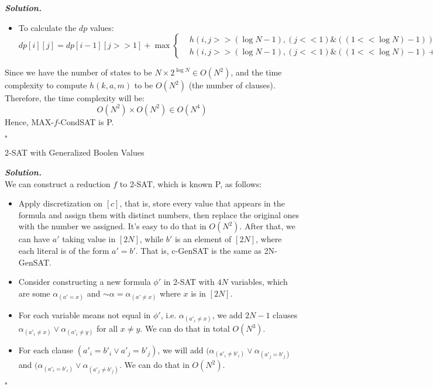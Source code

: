 \documentclass[12pt, a4paper, UTF8]{article}
\newenvironment{solution}[1][\it{Solution}]{\textbf{#1. }\\}{\begin{flushright}$\square$\end{flushright}}
\begin{document}
\begin{subprobs}
\begin{subprobs}
\begin{solution}
\begin{itemize}
            \item To calculate the $dp$ values:
                $$dp[i][j] = dp[i - 1][j >> 1] + \max\left\{\begin{aligned}&h(i, j >> (\log{N} - 1), (j << 1) \& ((1 << \log{N}) - 1)),\\
                    &h(i, j >> (\log{N} - 1), (j << 1) \& ((1 << \log{N}) - 1) + 1)
                \end{aligned}\right\}$$
        \end{itemize}
        Since we have the number of states to be $N \times 2^{\log{N}} \in O(N^2)$, and the time complexity to compute $h(k, a, m)$ to be $O(N^2)$ (the number of clauses).\\
        Therefore, the time complexity will be:
        $$O(N^2) \times O(N^2) \in O(N^4)$$
        Hence, MAX-$f$-CondSAT is P.
    \end{solution}
\end{subprobs}
\item 2-SAT with Generalized Boolen Values
\begin{subprobs}
\item
    \begin{solution}
        We can construct a reduction $f$ to 2-SAT, which is known P, as follows:\\
        \begin{itemize}
            \item Apply discretization on $[c]$, that is, store every value that appears in the formula and assign them with distinct numbers, then replace the original ones with the number we assigned. It's easy to do that in $O(N^2)$. After that, we can have $a'$ taking value in $[2N]$, while $b'$ is an element of $[2N]$, where each literal is of the form $a' = b'$. That is, c-GenSAT is the same as 2N-GenSAT.
            \item Consider constructing a new formula $\phi'$ in 2-SAT with $4N$ variables, which are some $\alpha_{(a' = x)}$ and $\sim{}\alpha = \alpha_{(a' \neq x)}$ where $x$ is in $[2N]$.\\
            \item For each variable means not equal in $\phi'$, i.e. $\alpha_{(a'_i \neq x)}$, we add $2N - 1$ clauses $\alpha_{(a'_i \neq x)} \vee \alpha_{(a'_i \neq y)}$ for all $x \neq y$. We can do that in total $O(N^3)$.
            \item For each clause $(a'_i = b'_i \vee a'_j = b'_j)$, we will add $(\alpha_{(a'_i \neq b'_i)} \vee \alpha_{(a'_j = b'_j)}$ and $(\alpha_{(a'_i = b'_i)} \vee \alpha_{(a'_j \neq b'_j)}$. We can do that in $O(N^2)$.

\end{itemize}
\end{solution}
\end{subprobs}
\end{subprobs}
\end{document}
